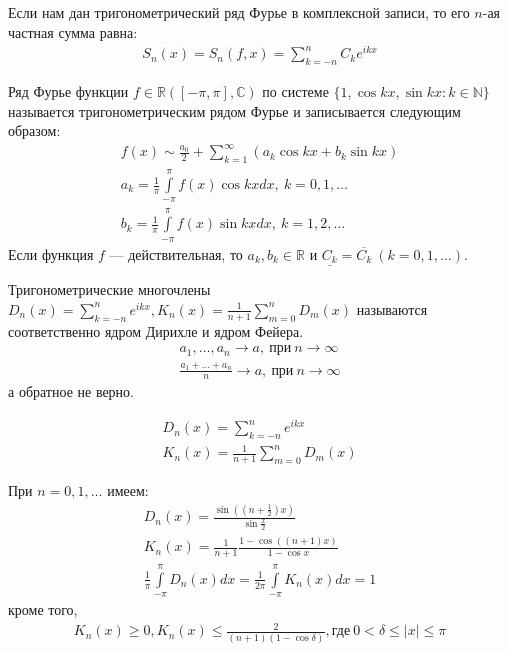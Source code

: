 \begin{definition}
  Если нам дан тригонометрический ряд Фурье в комплексной записи, то его
  $n$-ая частная сумма равна:
  \begin{gather}
    S_n(x) = S_n(f, x) = \sum\limits_{k = -n}^{n} C_k e^{ikx}
    \label{def441:eq1}
  \end{gather}
\end{definition}

\begin{definition}
  Ряд Фурье функции $f \in \mathbb{R}([-\pi, \pi], \mathbb{C})$ по системе
  $\{1, \cos kx, \sin kx: k \in \mathbb{N}\}$ называется тригонометрическим
  рядом Фурье и записывается следующим образом:
  \begin{gather}
    f(x) \sim \frac{a_0}{2} + \sum\limits_{k = 1}^{\infty} (a_k \cos kx + b_k
    \sin kx)
    \label{def442:sim1} \\
    a_k = \frac{1}{\pi} \int\limits_{-\pi}^\pi f(x) \cos kx dx, \ k = 0, 1,
    \dots
    \label{def442:coef1} \\
    b_k = \frac{1}{\pi} \int\limits_{-\pi}^\pi f(x) \sin kx dx, \ k = 1, 2,
    \dots
    \label{def442:coef2}
  \end{gather}
  Если функция $f$ --- действительная, то $a_k, b_k \in \mathbb{R}$ и
  $\underline{C_k} = \overline{C_k} \ (k = 0, 1, \dots)$.
\end{definition}

\begin{definition}
  Тригонометрические многочлены $D_n(x) = \sum\limits_{k = -n}^{n} e^{ikx},
  K_n(x) = \frac{1}{n + 1} \sum\limits_{m = 0}^{n} D_m(x)$ называются
  соответственно ядром Дирихле и ядром Фейера.
  \begin{gather*}
    a_1, \dots, a_n \to a, \ \text{при} \ n \to \infty \\
    \frac{a_1 + \dots + a_n}{n} \to a, \ \text{при} \ n \to \infty
  \end{gather*}
  а обратное не верно.
\end{definition}

\begin{gather}
  D_n(x) = \sum\limits_{k = -n}^{n} e^{ikx}
  \label{ch44:kernels} \\
  K_n(x) = \frac{1}{n + 1} \sum\limits_{m = 0}^{n} D_m(x)
\end{gather}

\begin{theorem}
  При $n = 0, 1, \dots$ имеем:
  \begin{gather}
    D_n(x) = \frac{\sin((n + \frac{1}{2})x)}{\sin \frac{x}{2}}
    \label{th441:eq1} \\
    K_n(x) = \frac{1}{n + 1} \frac{1 - \cos ((n + 1)x)}{1 - \cos x}
    \label{th441:eq2} \\
    \frac{1}{\pi} \int\limits_{-\pi}^\pi D_n(x) dx = \frac{1}{2\pi}
    \int\limits_{-\pi}^\pi K_n(x) dx = 1
    \label{th441:eq3}
  \end{gather}
  кроме того,
  \begin{gather}
    K_n(x) \geq 0, K_n(x) \leq \frac{2}{(n+1)(1 - \cos \delta)},
    \text{где} \ 0 < \delta \leq |x| \leq \pi
    \label{th441:uneq1}
  \end{gather}
\end{theorem}

